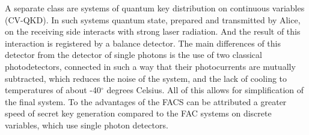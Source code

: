 A separate class are systems of quantum key distribution on continuous variables (CV-QKD). In such systems quantum state, prepared and transmitted by Alice, on the receiving side interacts with strong laser radiation. And the result of this interaction is registered by a balance detector. The main differences of this detector from the detector of single photons is the use of two classical photodetectors, connected in such a way that their photocurrents are mutually subtracted, which reduces the noise of the system, and the lack of cooling to temperatures of about -40$^{\circ}$ degrees Celsius. All of this allows for simplification of the final system. To the advantages of the FACS can be attributed a greater speed of secret key generation compared to the FAC systems on discrete variables, which use single photon detectors. 

